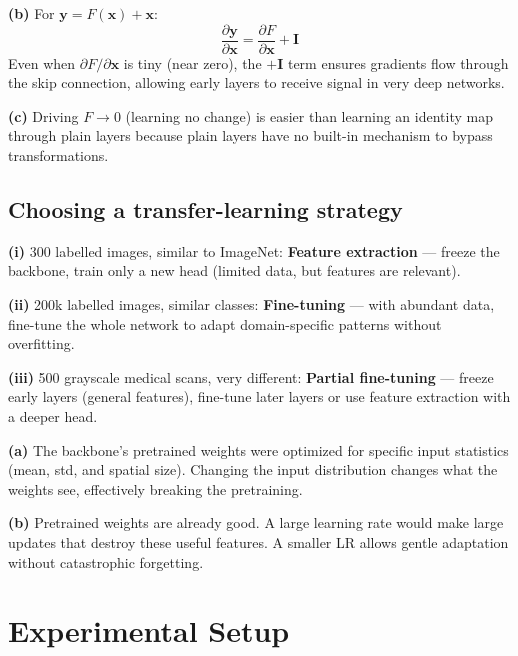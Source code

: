 \documentclass[10pt,twocolumn,letterpaper]{article}
\begin{document}
\textbf{(b)} For $\mathbf{y} = F(\mathbf{x}) + \mathbf{x}$:
\begin{equation}
\frac{\partial \mathbf{y}}{\partial \mathbf{x}}
= \frac{\partial F}{\partial \mathbf{x}} + \mathbf{I}
\end{equation}
Even when $\partial F/\partial \mathbf{x}$ is tiny (near zero), the $+\mathbf{I}$
term ensures gradients flow through the skip connection, allowing early layers
to receive signal in very deep networks.

\textbf{(c)} Driving $F \to 0$ (learning no change) is easier than learning an
identity map through plain layers because plain layers have no built-in
mechanism to bypass transformations.

\subsection{Choosing a transfer-learning strategy}

\textbf{(i)} 300 labelled images, similar to ImageNet: \textbf{Feature
extraction} — freeze the backbone, train only a new head (limited data, but
features are relevant).

\textbf{(ii)} 200k labelled images, similar classes: \textbf{Fine-tuning}
— with abundant data, fine-tune the whole network to adapt domain-specific
patterns without overfitting.

\textbf{(iii)} 500 grayscale medical scans, very different: \textbf{Partial
fine-tuning} — freeze early layers (general features), fine-tune later layers
or use feature extraction with a deeper head.

\textbf{(a)} The backbone's pretrained weights were optimized for specific input
statistics (mean, std, and spatial size). Changing the input distribution
changes what the weights see, effectively breaking the pretraining.

\textbf{(b)} Pretrained weights are already good. A large learning rate would
make large updates that destroy these useful features. A smaller LR allows
gentle adaptation without catastrophic forgetting.

\section{Experimental Setup}\label{sec:setup}
\end{document}
